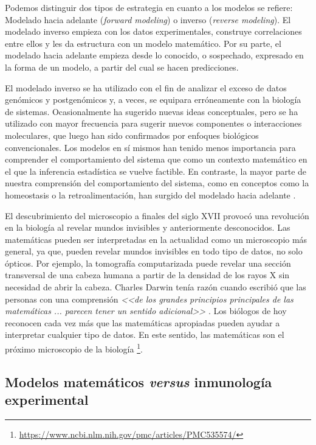 Podemos distinguir dos tipos de estrategia en cuanto a los modelos se refiere: Modelado hacia adelante (\textit{forward modeling}) o inverso (\textit{reverse modeling}). El modelado inverso empieza con los datos experimentales, construye correlaciones entre ellos y les da estructura con un modelo matemático. Por su parte, el modelado hacia adelante empieza desde lo conocido, o sospechado, expresado en la forma de un modelo, a partir del cual se hacen predicciones. 

El modelado inverso se ha utilizado con el fin de analizar el exceso de datos genómicos y postgenómicos y, a veces, se equipara erróneamente con la biología de sistemas. Ocasionalmente ha sugerido nuevas ideas conceptuales, pero se ha utilizado con mayor frecuencia para sugerir nuevos componentes o interacciones moleculares, que luego han sido confirmados por enfoques biológicos convencionales. Los modelos en sí mismos han tenido menos importancia para comprender el comportamiento del sistema que como un contexto matemático en el que la inferencia estadística se vuelve factible. En contraste, la mayor parte de nuestra comprensión del comportamiento del sistema, como en conceptos como la homeostasis o la retroalimentación, han surgido del modelado hacia adelante \citep{Gunawardena2014}.

El descubrimiento del microscopio a finales del siglo XVII provocó una revolución en la biología al revelar mundos invisibles y anteriormente desconocidos. Las matemáticas pueden ser interpretadas en la actualidad como un microscopio más general, ya que, pueden revelar mundos invisibles en todo tipo de datos, no solo ópticos. Por ejemplo, la tomografía computarizada puede revelar una sección transversal de una cabeza humana a partir de la densidad de los rayos X sin necesidad de abrir la cabeza. Charles Darwin tenía razón cuando escribió que las personas con una comprensión \textit{<<de los grandes principios principales de las matemáticas ... parecen tener un sentido adicional>>} \citep{darwin1887life}. Los biólogos de hoy reconocen cada vez más que las matemáticas apropiadas pueden ayudar a interpretar cualquier tipo de datos. En este sentido, las matemáticas son el próximo microscopio de la biología \footnote{\url{https://www.ncbi.nlm.nih.gov/pmc/articles/PMC535574/}}.

\subsection{Modelos matemáticos \textit{versus} inmunología experimental}


